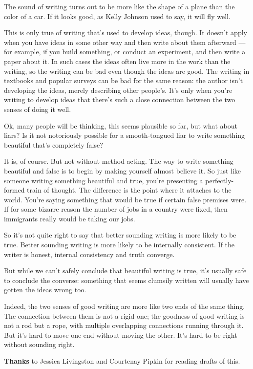 \documentclass[12pt]{book}
\begin{document}
The sound of writing turns out to be more like the shape of a plane than
the color of a car. If it looks good, as Kelly Johnson used to say, it
will fly well.

This is only true of writing that's used to develop ideas, though. It
doesn't apply when you have ideas in some other way and then write about
them afterward --- for example, if you build something, or conduct an
experiment, and then write a paper about it. In such cases the ideas
often live more in the work than the writing, so the writing can be bad
even though the ideas are good. The writing in textbooks and popular
surveys can be bad for the same reason: the author isn't developing the
ideas, merely describing other people's. It's only when you're writing
to develop ideas that there's such a close connection between the two
senses of doing it well.

Ok, many people will be thinking, this seems plausible so far, but what
about liars? Is it not notoriously possible for a smooth-tongued liar to
write something beautiful that's completely false?

It is, of course. But not without method acting. The way to write
something beautiful and false is to begin by making yourself almost
believe it. So just like someone writing something beautiful and true,
you're presenting a perfectly-formed train of thought. The difference is
the point where it attaches to the world. You're saying something that
would be true if certain false premises were. If for some bizarre reason
the number of jobs in a country were fixed, then immigrants really would
be taking our jobs.

So it's not quite right to say that better sounding writing is more
likely to be true. Better sounding writing is more likely to be
internally consistent. If the writer is honest, internal consistency and
truth converge.

But while we can't safely conclude that beautiful writing is true, it's
usually safe to conclude the converse: something that seems clumsily
written will usually have gotten the ideas wrong too.

Indeed, the two senses of good writing are more like two ends of the
same thing. The connection between them is not a rigid one; the goodness
of good writing is not a rod but a rope, with multiple overlapping
connections running through it. But it's hard to move one end without
moving the other. It's hard to be right without sounding right.


\textbf{Thanks} to Jessica Livingston and Courtenay Pipkin for reading
drafts of this.
\end{document}
